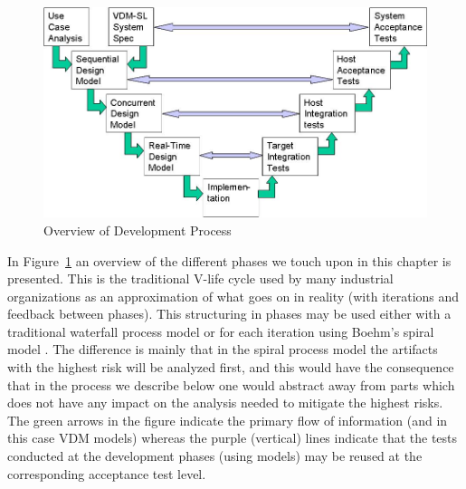 \documentclass{overturerepchap}
\begin{document}
\begin{figure}
\begin{center}
\includegraphics[width=\textwidth]{figures/lifecycle.jpg}
\end{center}






\caption{Overview of Development Process}\label{fig:processoverview}
\end{figure}

In Figure~\ref{fig:processoverview} an overview of the different
phases we touch upon in this chapter is presented. This is the
traditional V-life cycle used by many industrial organizations as
an approximation of what goes on in reality (with iterations and feedback
between phases).  This
structuring in phases may be used either with a traditional waterfall
process model or for each iteration using Boehm's spiral model
\cite{Sommerville82, Boehm88}.  The difference is mainly that in the
spiral process model the artifacts with the highest risk will be
analyzed first, and this would have the consequence that in the
process we describe below one would abstract away from parts which
does not have any impact on the analysis needed to mitigate the
highest risks. The green arrows in the figure indicate the primary flow of 
information (and in this case VDM models) whereas the purple (vertical) lines
indicate that the tests conducted at the development phases (using models)
may be reused at the corresponding acceptance test level.
\end{document}
